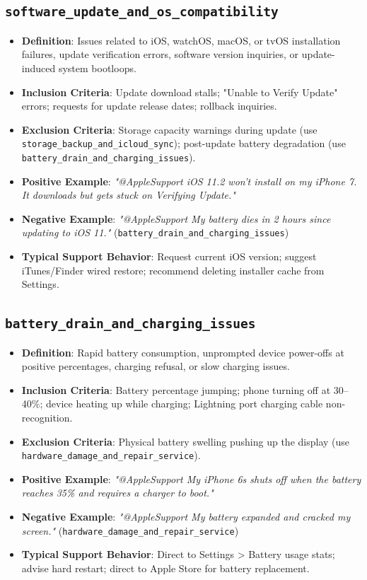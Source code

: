 \documentclass[11pt,a4paper]{article}
\begin{document}
\subsection{\texttt{software\_update\_and\_os\_compatibility}}
\begin{itemize}[leftmargin=*]
    \item \textbf{Definition}: Issues related to iOS, watchOS, macOS, or tvOS installation failures, update verification errors, software version inquiries, or update-induced system bootloops.
    \item \textbf{Inclusion Criteria}: Update download stalls; "Unable to Verify Update" errors; requests for update release dates; rollback inquiries.
    \item \textbf{Exclusion Criteria}: Storage capacity warnings during update (use \texttt{storage\_backup\_and\_icloud\_sync}); post-update battery degradation (use \texttt{battery\_drain\_and\_charging\_issues}).
    \item \textbf{Positive Example}: \textit{"@AppleSupport iOS 11.2 won't install on my iPhone 7. It downloads but gets stuck on Verifying Update."}
    \item \textbf{Negative Example}: \textit{"@AppleSupport My battery dies in 2 hours since updating to iOS 11."} (\texttt{battery\_drain\_and\_charging\_issues})
    \item \textbf{Typical Support Behavior}: Request current iOS version; suggest iTunes/Finder wired restore; recommend deleting installer cache from Settings.
\end{itemize}

\subsection{\texttt{battery\_drain\_and\_charging\_issues}}
\begin{itemize}[leftmargin=*]
    \item \textbf{Definition}: Rapid battery consumption, unprompted device power-offs at positive percentages, charging refusal, or slow charging issues.
    \item \textbf{Inclusion Criteria}: Battery percentage jumping; phone turning off at 30--40\%; device heating up while charging; Lightning port charging cable non-recognition.
    \item \textbf{Exclusion Criteria}: Physical battery swelling pushing up the display (use \texttt{hardware\_damage\_and\_repair\_service}).
    \item \textbf{Positive Example}: \textit{"@AppleSupport My iPhone 6s shuts off when the battery reaches 35\% and requires a charger to boot."}
    \item \textbf{Negative Example}: \textit{"@AppleSupport My battery expanded and cracked my screen."} (\texttt{hardware\_damage\_and\_repair\_service})
    \item \textbf{Typical Support Behavior}: Direct to Settings > Battery usage stats; advise hard restart; direct to Apple Store for battery replacement.
\end{itemize}
\end{document}

